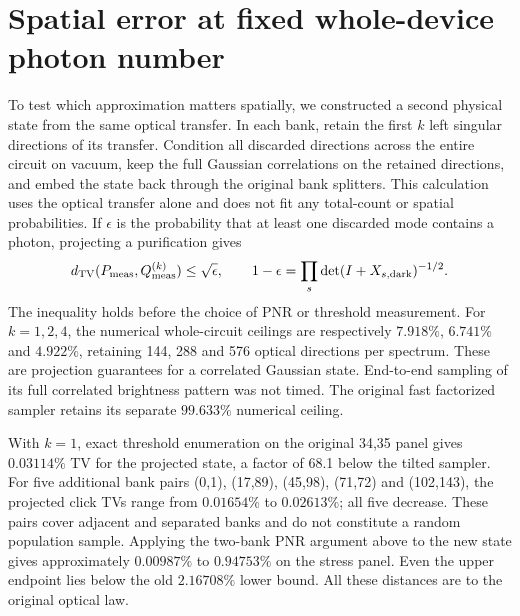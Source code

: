 \documentclass[11pt]{article}
\newcommand{\TV}{d_{\mathrm{TV}}}
\begin{document}
\section{Spatial error at fixed whole-device photon number}
To test which approximation matters spatially, we constructed a second physical state from the same optical transfer. In each bank, retain the first $k$ left singular directions of its transfer. Condition all discarded directions across the entire circuit on vacuum, keep the full Gaussian correlations on the retained directions, and embed the state back through the original bank splitters. This calculation uses the optical transfer alone and does not fit any total-count or spatial probabilities. If $\epsilon$ is the probability that at least one discarded mode contains a photon, projecting a purification gives
\begin{equation}
 \TV(P_{\rm meas},Q^{(k)}_{\rm meas})\leq\sqrt{\epsilon},
 \qquad 1-\epsilon=\prod_s\det(I+X_{s,\mathrm{dark}})^{-1/2}.
\end{equation}
The inequality holds before the choice of PNR or threshold measurement. For $k=1,2,4$, the numerical whole-circuit ceilings are respectively $7.918\%$, $6.741\%$ and $4.922\%$, retaining 144, 288 and 576 optical directions per spectrum. These are projection guarantees for a correlated Gaussian state. End-to-end sampling of its full correlated brightness pattern was not timed. The original fast factorized sampler retains its separate $99.633\%$ numerical ceiling.

With $k=1$, exact threshold enumeration on the original 34,35 panel gives $0.03114\%$ TV for the projected state, a factor of 68.1 below the tilted sampler. For five additional bank pairs (0,1), (17,89), (45,98), (71,72) and (102,143), the projected click TVs range from $0.01654\%$ to $0.02613\%$; all five decrease. These pairs cover adjacent and separated banks and do not constitute a random population sample. Applying the two-bank PNR argument above to the new state gives approximately $0.00987\%$ to $0.94753\%$ on the stress panel. Even the upper endpoint lies below the old $2.16708\%$ lower bound. All these distances are to the original optical law.
\end{document}
